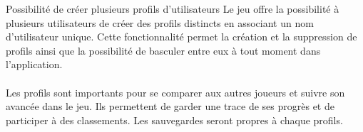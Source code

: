 {
    Possibilité de créer plusieurs profils d'utilisateurs
}
{
    Le jeu offre la possibilité à plusieurs utilisateurs de créer des profils distincts en associant un nom d'utilisateur unique. Cette fonctionnalité permet la création et la suppression de profils ainsi que la possibilité de basculer entre eux à tout moment dans l'application.
    \\
    \\
    Les profils sont importants pour se comparer aux autres joueurs et suivre son avancée dans le jeu. Ils permettent de garder une trace de ses progrès et de participer à des classements.
    Les sauvegardes seront propres à chaque profils.
}